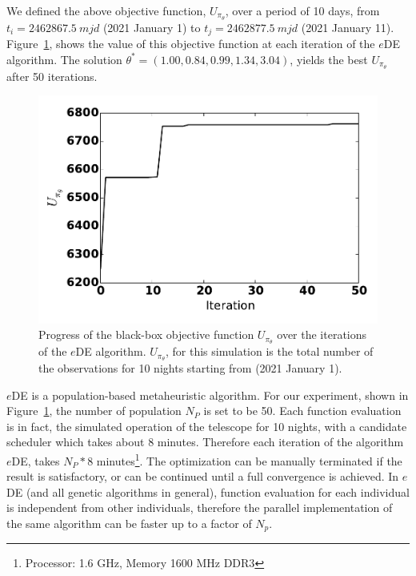 \documentclass[12pt]{aastex62}
\theoremstyle{definition}
\begin{document}
We defined the above objective function, $U_{\pi_{\theta}}$, over a period of 10 days, from $t_i = 2462867.5~mjd$ (2021 January 1) to $t_j = 2462877.5~mjd$ (2021 January 11). Figure~\ref{fig_eDEObjectiveFunction}, shows the value of this objective function at each iteration of the $e$DE algorithm. The solution $\theta^* = (1.00, 0.84, 0.99,  1.34,  3.04)$, yields the best $U_{\pi_{\theta}}$ after 50 iterations.
%
\begin{figure}[h!]
\begin{center}
\includegraphics[width=0.5\linewidth]{eDEObjectiveFunction.pdf}
\caption{Progress of the black-box objective function $U_{\pi_{\theta}}$ over the iterations of the $e$DE algorithm. $U_{\pi_{\theta}}$, for this simulation is the total number of the observations for 10 nights starting from (2021 January 1).}
\label{fig_eDEObjectiveFunction}
\end{center}
\end{figure}

$e$DE is a population-based metaheuristic algorithm. For our experiment, shown in Figure~\ref{fig_eDEObjectiveFunction}, the number of population $N_P$ is set to be 50. Each function evaluation is in fact, the simulated operation of the telescope for 10 nights, with a candidate scheduler which takes about 8 minutes. Therefore each iteration of the algorithm $e$DE, takes $N_P * 8$ minutes\footnote{Processor: 1.6 GHz, Memory 1600 MHz DDR3}. The optimization can be manually terminated if the result is satisfactory, or can be continued until a full convergence is achieved. In $e$DE (and all genetic algorithms in general), function evaluation for each individual is independent from other individuals, therefore the parallel implementation of the same algorithm can be faster up to a factor of $N_p$. 
 
\end{document}
